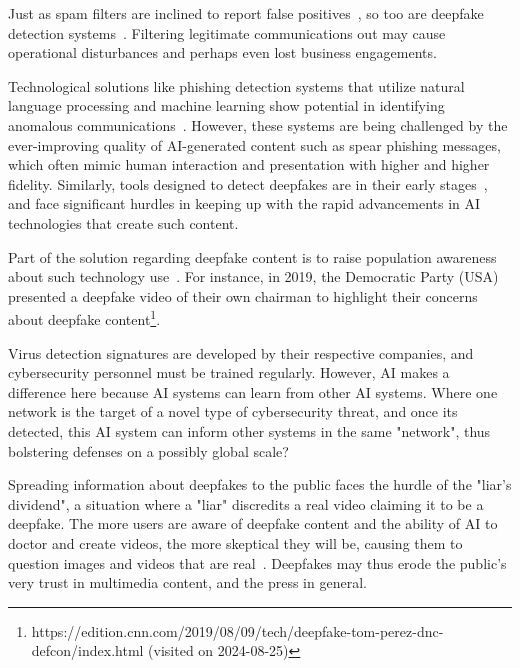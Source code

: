 Just as spam filters are inclined to report false positives~\citep{fakhouri_AI_Driven_Solutions_SE_Attacks_2024}, so too are deepfake detection systems~\citep{mirsky_Creation_Detection_Deepfakes_2021}. Filtering legitimate communications out may cause operational disturbances and perhaps even lost business engagements.

Technological solutions like phishing detection systems that utilize natural language processing and machine learning show potential in identifying anomalous communications~\citep{basit_Comprehensive_Survey_AI_Phishing_Detection_2021}. However, these systems are being challenged by the ever-improving quality of AI-generated content such as spear phishing messages, which often mimic human interaction and presentation with higher and higher fidelity. Similarly, tools designed to detect deepfakes are in their early stages~\citep{mirsky_Creation_Detection_Deepfakes_2021}, and face significant hurdles in keeping up with the rapid advancements in AI technologies that create such content.



Part of the solution regarding deepfake content is to raise population awareness about such technology use~\citep{blauth_AI_Crime_Overview_Malicious_Use_Abuse_2022}. For instance, in 2019, the Democratic Party (USA) presented a deepfake video of their own chairman to highlight their concerns about deepfake content\footnote{https://edition.cnn.com/2019/08/09/tech/deepfake-tom-perez-dnc-defcon/index.html (visited on 2024-08-25)}.

Virus detection signatures are developed by their respective companies, and cybersecurity personnel must be trained regularly. However, AI makes a difference here because AI systems can learn from other AI systems. Where one network is the target of a novel type of cybersecurity threat, and once its detected, this AI system can inform other systems in the same "network", thus bolstering defenses on a possibly global scale?

Spreading information about deepfakes to the public faces the hurdle of the "liar's dividend", a situation where a "liar" discredits a real video claiming it to be a deepfake. The more users are aware of deepfake content and the ability of AI to doctor and create videos, the more skeptical they will be, causing them to question images and videos that are real~\citep{blauth_AI_Crime_Overview_Malicious_Use_Abuse_2022}. Deepfakes may thus erode the public's very trust in multimedia content, and the press in general.

